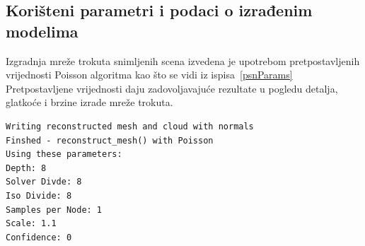 
\newpage
\subsection{Korišteni parametri i podaci o izrađenim modelima} %
\label{sub:Koristeni parametri i podaci o izradenim modelima}

Izgradnja mreže trokuta snimljenih scena izvedena je upotrebom
pretpostavljenih vrijednosti Poisson algoritma kao što se vidi iz 
ispisa~\ref{psnParams} Pretpostavljene vrijednosti daju zadovoljavajuće 
rezultate u pogledu detalja, glatkoće i brzine izrade mreže trokuta. 

\begin{lstlisting}[label=psnParams,caption={Ispis korištenih paramatera
iz aplikacije \texttt{mesh-reconstruction} }]
Writing reconstructed mesh and cloud with normals
Finshed - reconstruct_mesh() with Poisson
Using these parameters: 
Depth: 8
Solver Divde: 8
Iso Divide: 8
Samples per Node: 1
Scale: 1.1
Confidence: 0
\end{lstlisting}

